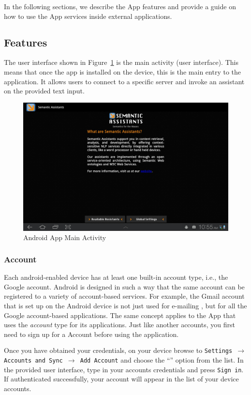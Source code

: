 In the following sections, we describe the \sa App features and provide a guide on how to use the \sa App services inside external applications.

\subsection{Features}
The user interface shown in Figure~\ref{fig:android_main} is the \sa main activity (user interface). This means that once the app is installed on the device, this is the main entry to the application. It allows users to connect to a specific \sa server and invoke an assistant on the provided text input.

\begin{figure}[htb]
\centering
\includegraphics[scale=0.35]{pictures/android_main.jpg}
\caption{\sa Android App Main Activity}
\label{fig:android_main}
\end{figure}
\subsubsection{\sa Account}
Each android-enabled device has at least one built-in account type, i.e., the Google account. Android is designed in such a way that the same account can be registered to a variety of account-based services. For example, the Gmail account that is set up on the Android device is not just used for e-mailing , but for all the Google account-based applications. The same concept applies to the \sa App that uses the \emph{\sa account} type for its applications. Just like another accounts, you first need to sign up for a \sa Account before using the application.

Once you have obtained your credentials, on your device browse to \texttt{Settings $\rightarrow$ Accounts and Sync $\rightarrow$ Add Account} and choose the ``\sa'' option from the list. In the provided user interface, type in your \sa accounts credentials and press \texttt{Sign in}. If authenticated successfully, your \sa account will appear in the list of your device accounts.

